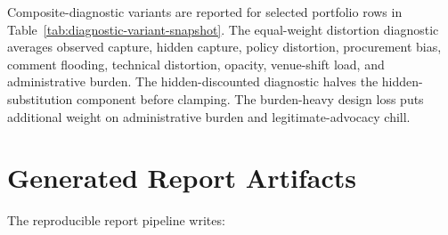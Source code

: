 

Composite-diagnostic variants are reported for selected portfolio rows in Table~\ref{tab:diagnostic-variant-snapshot}. The equal-weight distortion diagnostic averages observed capture, hidden capture, policy distortion, procurement bias, comment flooding, technical distortion, opacity, venue-shift load, and administrative burden. The hidden-discounted diagnostic halves the hidden-substitution component before clamping. The burden-heavy design loss puts additional weight on administrative burden and legitimate-advocacy chill.



\section{Generated Report Artifacts}

The reproducible report pipeline writes:

